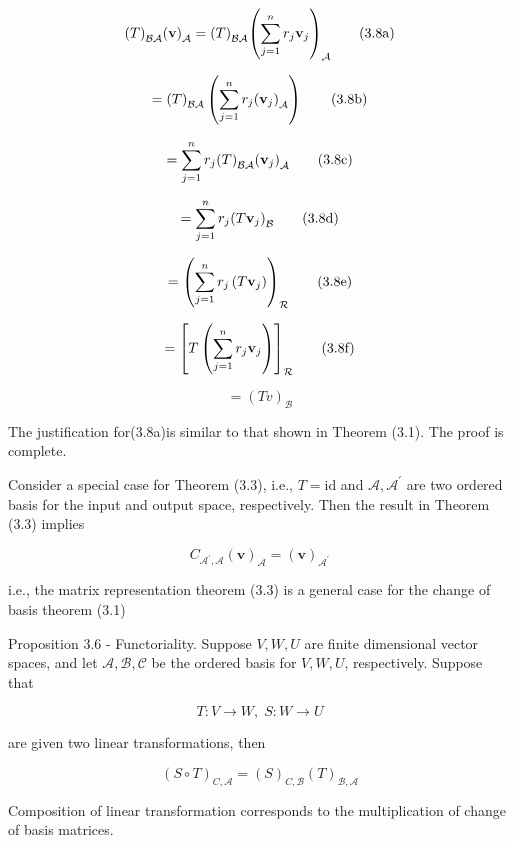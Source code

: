 \documentclass[11pt]{article}
\begin{document}
\[
{\left( T\right) }_{\mathcal{B}\mathcal{A}}{\left( \mathbf{v}\right) }_{\mathcal{A}} = {\left( T\right) }_{\mathcal{B}\mathcal{A}}{\left( \mathop{\sum }\limits_{{j = 1}}^n{r}_{j}{\bf v}_{j}\right) }_{\mathcal{A}} \tag{3.8a}
\]

\[
= {\left( T\right) }_{\mathcal{B}\mathcal{A}}\left( {\mathop{\sum }\limits_{{j = 1}}^n{r}_{j}{\left( {\bf v}_{j}\right) }_{\mathcal{A}}}\right)  \tag{3.8b}
\]

\[
= \mathop{\sum }\limits_{{j = 1}}^n{r}_{j}{\left( T\right) }_{\mathcal{B}\mathcal{A}}{\left( {\bf v}_{j}\right) }_{\mathcal{A}} \tag{3.8c}
\]

\[
= \mathop{\sum }\limits_{{j = 1}}^n{r}_{j}{\left( T{\bf v}_{j}\right) }_{\mathcal{B}} \tag{3.8d}
\]

\[
= {\left( \mathop{\sum }\limits_{{j = 1}}^n{r}_{j}\left( T{\bf v}_{j}\right) \right) }_{\mathcal{R}} \tag{3.8e}
\]

\[
= {\left\lbrack  T\left( \mathop{\sum }\limits_{{j = 1}}^n{r}_{j}{\bf v}_{j}\right) \right\rbrack  }_{\mathcal{R}} \tag{3.8f}
\]

\[
= {\left( Tv\right) }_{\mathcal{B}} \tag{3.8g}
\]

The justification for(3.8a)is similar to that shown in Theorem (3.1). The proof is complete.

Consider a special case for Theorem (3.3), i.e., \(T = \mathrm{{id}}\) and \(\mathcal{A},{\mathcal{A}}^{\prime }\) are two ordered basis for the input and output space, respectively. Then the result in Theorem (3.3) implies

\[
{C}_{{\mathcal{A}}^{\prime },\mathcal{A}}{\left( \mathbf{v}\right) }_{\mathcal{A}} = {\left( \mathbf{v}\right) }_{{\mathcal{A}}^{\prime }}
\]

i.e., the matrix representation theorem (3.3) is a general case for the change of basis theorem (3.1)

Proposition 3.6 - Functoriality. Suppose \(V,W,U\) are finite dimensional vector spaces, and let \(\mathcal{A},\mathcal{B},\mathcal{C}\) be the ordered basis for \(V,W,U\), respectively. Suppose that

\[
T : V \rightarrow  W,\;S : W \rightarrow  U
\]

are given two linear transformations, then

\[
{\left( S \circ  T\right) }_{C,\mathcal{A}} = {\left( S\right) }_{C,\mathcal{B}}{\left( T\right) }_{\mathcal{B},\mathcal{A}}
\]

Composition of linear transformation corresponds to the multiplication of change of basis matrices.
\end{document}
